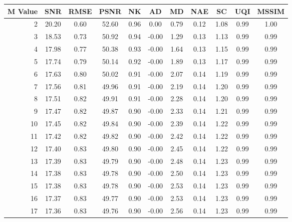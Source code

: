     \begin{table}[htb]
       \small

    \centering 
    \begin{tabular}{|r|cccccccccc|}\hline
   M Value &  SNR &  RMSE &  PSNR &  NK &  AD &  MD &  NAE &  SC &  UQI &  MSSIM \\ \hline 
      2 &  20.20 &  0.60 &  52.60 &  0.96 &  0.00 &  0.79 &  0.12 &  1.08 &  0.99 &  1.00  \\ \hline 
      3 &  18.53 &  0.73 &  50.92 &  0.94 &  -0.00 &  1.29 &  0.13 &  1.13 &  0.99 &  0.99  \\ \hline 
      4 &  17.98 &  0.77 &  50.38 &  0.93 &  -0.00 &  1.64 &  0.13 &  1.15 &  0.99 &  0.99  \\ \hline 
      5 &  17.74 &  0.79 &  50.14 &  0.92 &  -0.00 &  1.89 &  0.13 &  1.17 &  0.99 &  0.99  \\ \hline 
      6 &  17.63 &  0.80 &  50.02 &  0.91 &  -0.00 &  2.07 &  0.14 &  1.19 &  0.99 &  0.99  \\ \hline 
      7 &  17.56 &  0.81 &  49.96 &  0.91 &  -0.00 &  2.19 &  0.14 &  1.20 &  0.99 &  0.99  \\ \hline 
      8 &  17.51 &  0.82 &  49.91 &  0.91 &  -0.00 &  2.28 &  0.14 &  1.20 &  0.99 &  0.99  \\ \hline 
      9 &  17.47 &  0.82 &  49.87 &  0.90 &  -0.00 &  2.33 &  0.14 &  1.21 &  0.99 &  0.99  \\ \hline 
      10 &  17.45 &  0.82 &  49.84 &  0.90 &  -0.00 &  2.39 &  0.14 &  1.22 &  0.99 &  0.99  \\ \hline 
      11 &  17.42 &  0.82 &  49.82 &  0.90 &  -0.00 &  2.42 &  0.14 &  1.22 &  0.99 &  0.99  \\ \hline 
      12 &  17.40 &  0.83 &  49.80 &  0.90 &  -0.00 &  2.45 &  0.14 &  1.22 &  0.99 &  0.99  \\ \hline 
      13 &  17.39 &  0.83 &  49.79 &  0.90 &  -0.00 &  2.48 &  0.14 &  1.23 &  0.99 &  0.99  \\ \hline 
      14 &  17.38 &  0.83 &  49.78 &  0.90 &  -0.00 &  2.50 &  0.14 &  1.23 &  0.99 &  0.99  \\ \hline 
      15 &  17.38 &  0.83 &  49.78 &  0.90 &  -0.00 &  2.53 &  0.14 &  1.23 &  0.99 &  0.99  \\ \hline 
      16 &  17.37 &  0.83 &  49.77 &  0.90 &  -0.00 &  2.53 &  0.14 &  1.23 &  0.99 &  0.99  \\ \hline 
      17 &  17.36 &  0.83 &  49.76 &  0.90 &  -0.00 &  2.56 &  0.14 &  1.23 &  0.99 &  0.99  \\ \hline 

\end{tabular}
\end{table}
